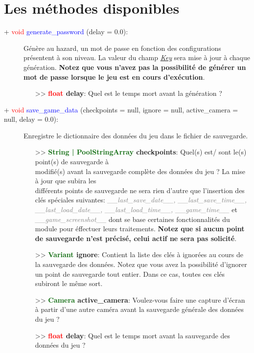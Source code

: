 \documentclass[a4paper, 11pt]{article}
\begin{document}
	\section{Les méthodes disponibles}
	\begin{description}
		\item [+ \textcolor{red}{void} \textcolor{blue}{generate\_password} (delay = 0.0):] Génère au 
		hazard, un mot de passe en fonction des configurations présentent à son niveau. La valeur du champ
		\textit{\hyperlink{pass}{Key}} sera mise à jour à chaque \\génération. \textbf{Notez que vous n'avez
		pas la possibilité de générer un mot de passe lorsque le jeu est en cours d'exécution}.
		\begin{itemize}
			\item [>> \textbf{\textcolor{red}{float} delay}:] Quel est le temps mort avant la génération ?\\
		\end{itemize}
	\end{description}
	\newpage \begin{description}
		\item [+ \textcolor{red}{void} \textcolor{blue}{save\_game\_data} (checkpoints = null, ignore =
		null, active\_camera = null, delay = 0.0):] Enregistre le dictionnaire des données du jeu dans le
		fichier de sauvegarde.
		\begin{itemize}
			\item [>> \textbf{\textcolor{darkgreen}{String | PoolStringArray} checkpoints}:] Quel(s) est/
			sont le(s) point(s) de sauvegarde à \\modifié(s) avant la sauvegarde complète des données du jeu
			? La mise à jour que subira les \\différents points de sauvegarde ne sera rien d'autre que
			l'insertion des clés spéciales suivantes: \textit{\textcolor{gray}{\_\_last\_save\_date\_\_,
			\_\_last\_save\_time\_\_, \_\_last\_load\_date\_\_, \_\_last\_load\_time\_\_,
			\_\_game\_time\_\_}} et \textit{\textcolor{gray}{\_\_game\_screenshot\_\_}} dont se base
			certaines fonctionnalités du module pour éffectuer leurs traitements. \textbf{Notez que si aucun
			point de sauvegarde n'est précisé, celui actif ne sera pas solicité}.
			\item [>> \textbf{\textcolor{darkgreen}{Variant} ignore}:] Contient la liste des clés à ignorées
			au cours de la sauvegarde des données. Notez que vous avez la possibilité d'ignorer un point de
			sauvegarde tout entier. Dans ce cas, toutes ces clés subiront le même sort.
			\item [>> \textbf{\textcolor{darkgreen}{Camera} active\_camera}:] Voulez-vous faire une capture
			d'écran à partir d'une autre caméra avant la sauvegarde générale des données du jeu ?
			\item [>> \textbf{\textcolor{red}{float} delay}:] Quel est le temps mort avant la sauvegarde des 
			données du jeu ?\\
		\end{itemize}
	\end{description}
\end{document}

